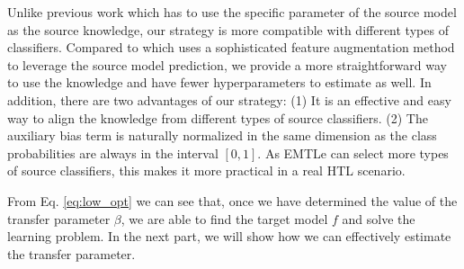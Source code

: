 Unlike previous work\cite{aytar2011tabula,tommasi2014learning,yang2007adapting} which has to use the specific parameter of the source model as the source knowledge, our strategy is more compatible with different types of classifiers. Compared to \cite{jie2011multiclass} which uses a sophisticated feature augmentation method to leverage the source model prediction, we provide a more straightforward way to use the knowledge and have fewer hyperparameters to estimate as well.
In addition, there are two advantages of our strategy: (1) It is an effective and easy way to align the knowledge from different types of source classifiers.
(2) The auxiliary bias term is naturally normalized in the same dimension as the class probabilities are always in the interval $[0,1]$.  As EMTLe can select more types of source classifiers, this makes it more practical in a real HTL scenario.

From Eq. \eqref{eq:low_opt} we can see that, once we have determined the value of the transfer parameter $\beta$, we are able to find the target model $f$ and solve the learning problem. In the next part, we will show how we can effectively estimate the transfer parameter.





